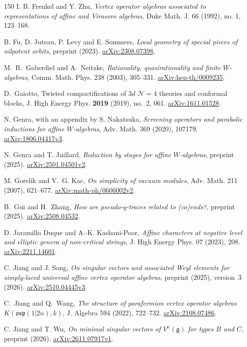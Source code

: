 \documentclass[11pt,a4paper]{amsart}
\numberwithin{equation}{section}
\theoremstyle{definition}
\theoremstyle{remark}
\newcommand{\arxiv}[1]{\href{https://arxiv.org/abs/#1}{arXiv:#1}}
\begin{document}
\begin{thebibliography}{150}
 I. B. Frenkel and Y. Zhu,
\emph{Vertex operator algebras associated to representations of affine and Virasoro algebras},
Duke Math. J. 66 (1992), no. 1, 123--168.

 B. Fu, D. Juteau, P. Levy and E. Sommers,
\emph{Local geometry of special pieces of nilpotent orbits},
preprint (2023). \arxiv{2308.07398}.



 M.~R.~Gaberdiel and A.~Neitzke,
\emph{Rationality, quasirationality and finite $W$-algebras},
Comm. Math. Phys. 238 (2003), 305--331. \arxiv{hep-th/0009235}.

D.~Gaiotto,
Twisted compactifications of $3d$ $\mathcal N=4$ theories
and conformal blocks,
J. High Energy Phys. \textbf{2019} (2019), no.~2, 061.
\arxiv{1611.01528}.


 N. Genra, with an appendix by S. Nakatsuka,
\emph{Screening operators and parabolic inductions for affine $W$-algebras},
Adv. Math. 369 (2020), 107179. \arxiv{1806.04417v3}.

 N. Genra and T. Juillard,
\emph{Reduction by stages for affine $W$-algebras},
preprint (2025). \arxiv{2501.04501v2}.

 M. Gorelik and V.~G. Kac,
\emph{On simplicity of vacuum modules},
Adv. Math. 211 (2007), 621--677. \arxiv{math-ph/0606002v2}.

 B.~Gui and H.~Zhang,
\emph{How are pseudo-$q$-traces related to (co)ends?}, preprint (2025).
\arxiv{2508.04532}.

 D. Jaramillo Duque and A.-K. Kashani-Poor,
\emph{Affine characters at negative level and elliptic genera of non-critical strings},
J. High Energy Phys. 07 (2023), 208. \arxiv{2211.14601}.

 C. Jiang and J. Song,
\emph{On singular vectors and associated Weyl elements for simply-laced
universal affine vertex operator algebras},
preprint (2025), version~3 (2026). \arxiv{2510.04445v3}.

 C.~Jiang and Q.~Wang,
\emph{The structure of parafermion vertex operator algebras $K(\mathfrak{osp}(1|2n),k)$},
J. Algebra 594 (2022), 722--732. \arxiv{2108.07486}.

 C. Jiang and T. Wu,
\emph{On minimal singular vectors of $V^\kappa(\mathfrak g)$
for types $B$ and $C$},
preprint (2026). \arxiv{2611.07917v1}.


\end{thebibliography}
\end{document}
